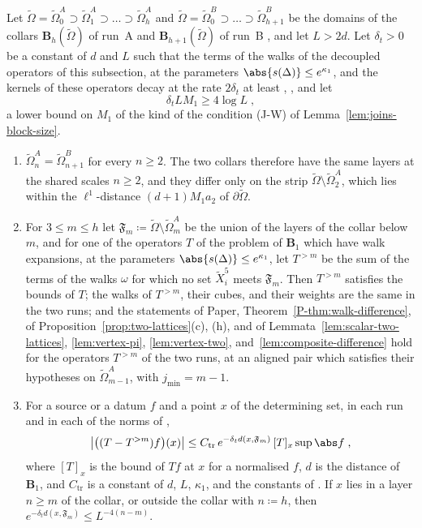 \begin{lemma}\label{lem:collar-two-runs}
Let $\tilde\Omega = \tilde\Omega^A_0 \supset \tilde\Omega^A_1 \supset \dots \supset \tilde\Omega^A_h$ and $\tilde\Omega = \tilde\Omega^B_0 \supset \dots \supset \tilde\Omega^B_{h+1}$ be the domains of the collars $\mathbf B_h(\tilde\Omega)$ of run~A and $\mathbf B_{h+1}(\tilde\Omega)$ of run~B \cite[p.~256, ll.~57--62]{BalabanCRE}, and let $L > 2d$. Let $\delta_t > 0$ be a constant of $d$ and $L$ such that the terms of the walks of the decoupled operators of this subsection, at the parameters $\abs{s(\Delta)} \leq e^{\kappa_1}$, and the kernels of these operators decay at the rate $2\delta_t$ at least \cite[(1.7), (1.11), (1.21)]{BalabanRG2}, \cite[(3.42), (3.132), (3.133)]{BalabanPBG}, and let
\begin{equation}\label{eq:truncation-condition}
    \delta_tLM_1 \geq 4\log L\;,
\end{equation}
a lower bound on $M_1$ of the kind of the condition (J-W) of Lemma~\ref{lem:joins-block-size}.
\begin{enumerate}[label=(\alph*)]
\item $\tilde\Omega^A_n = \tilde\Omega^B_{n+1}$ for every $n \geq 2$. The two collars therefore have the same layers at the shared scales $n \geq 2$, and they differ only on the strip $\tilde\Omega \setminus \tilde\Omega^A_2$, which lies within the $\ell^1$-distance $(d + 1)M_1a_2$ of $\partial\tilde\Omega$.
\item For $3 \leq m \leq h$ let $\mathfrak F_m \coloneqq \tilde\Omega \setminus \tilde\Omega^A_m$ be the union of the layers of the collar below $m$, and for one of the operators $T$ of the problem of $\mathbf B_1$ which have walk expansions, at the parameters $\abs{s(\Delta)} \leq e^{\kappa_1}$, let $T^{>m}$ be the sum of the terms of the walks $\omega$ for which no set $\tilde X^5_i$ meets $\mathfrak F_m$. Then $T^{>m}$ satisfies the bounds of $T$; the walks of $T^{>m}$, their cubes, and their weights are the same in the two runs; and the statements of Paper, Theorem~\ref{P-thm:walk-difference}, of Proposition~\ref{prop:two-lattices}(c), (h), and of Lemmata~\ref{lem:scalar-two-lattices}, \ref{lem:vertex-pi}, \ref{lem:vertex-two}, and~\ref{lem:composite-difference} hold for the operators $T^{>m}$ of the two runs, at an aligned pair which satisfies their hypotheses on $\tilde\Omega^A_{m-1}$, with $j_{\min} = m - 1$.
\item For a source or a datum $f$ and a point $x$ of the determining set, in each run and in each of the norms of \cite[(3.42)--(3.47), (3.132), (3.133)]{BalabanPBG},
\[
    \bigl\lvert\bigl((T - T^{>m})f\bigr)(x)\bigr\rvert \leq C_{\mathrm{tr}}\,e^{-\delta_td(x,\mathfrak F_m)}\,[T]_x\sup\abs f\;,
\]
where $[T]_x$ is the bound of $Tf$ at $x$ for a normalised $f$, $d$ is the distance \cite[(2.46)]{BalabanPRT2} of $\mathbf B_1$, and $C_{\mathrm{tr}}$ is a constant of $d$, $L$, $\kappa_1$, and the constants of \cite{BalabanPBG}. If $x$ lies in a layer $n \geq m$ of the collar, or outside the collar with $n \coloneqq h$, then $e^{-\delta_td(x,\mathfrak F_m)} \leq L^{-4(n-m)}$.
\end{enumerate}
\end{lemma}

